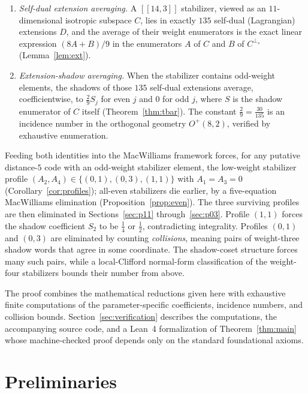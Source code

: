 \documentclass[11pt]{amsart}
\theoremstyle{definition}
\theoremstyle{remark}
\newcommand{\perps}{{\perp_s}}
\newcommand{\code}[1]{[\![#1]\!]}
\begin{document}
\begin{enumerate}
\item \emph{Self-dual extension averaging.}  A $\code{14,3}$ stabilizer,
viewed as an $11$-dimensional isotropic subspace $C$, lies in exactly $135$
self-dual (Lagrangian) extensions $D$, and the average of their weight
enumerators is the exact linear expression $(8A+B)/9$ in the enumerators
$A$ of $C$ and $B$ of $C^{\perps}$ (Lemma~\ref{lem:ext}).

\item \emph{Extension-shadow averaging.}  When the stabilizer contains
odd-weight elements, the shadows of those $135$ self-dual extensions
average, coefficientwise, to $\tfrac29 S_j$ for even $j$ and $0$ for odd
$j$, where $S$ is the shadow enumerator of $C$ itself
(Theorem~\ref{thm:tbar}).  The constant $\tfrac29=\tfrac{30}{135}$ is an
incidence number in the orthogonal geometry $O^+(8,2)$, verified by exhaustive
enumeration.
\end{enumerate}

Feeding both identities into the MacWilliams framework forces, for any
putative distance-$5$ code with an odd-weight stabilizer element, the
low-weight stabilizer profile
$(A_2,A_4)\in\{(0,1),(0,3),(1,1)\}$ with $A_1=A_3=0$
(Corollary~\ref{cor:profiles}); all-even stabilizers die earlier, by a
five-equation MacWilliams elimination (Proposition~\ref{prop:even}).  The
three surviving profiles are then eliminated in
Sections~\ref{sec:p11} through~\ref{sec:p03}.  Profile $(1,1)$ forces the shadow
coefficient $S_2$ to be $\tfrac14$ or $\tfrac12$, contradicting
integrality.  Profiles $(0,1)$ and $(0,3)$ are eliminated by counting
\emph{collisions}, meaning pairs of weight-three shadow words that agree in
some coordinate.  The shadow-coset structure forces many such pairs, while a
local-Clifford normal-form classification of the weight-four stabilizers
bounds their number from above.

The proof combines the mathematical reductions given here with exhaustive
finite computations of the parameter-specific coefficients, incidence
numbers, and collision bounds.  Section~\ref{sec:verification} describes the
computations, the accompanying source code, and a Lean~4 formalization of
Theorem~\ref{thm:main} whose machine-checked proof depends only on the
standard foundational axioms.

\section{Preliminaries}\label{sec:prelim}
\end{document}
